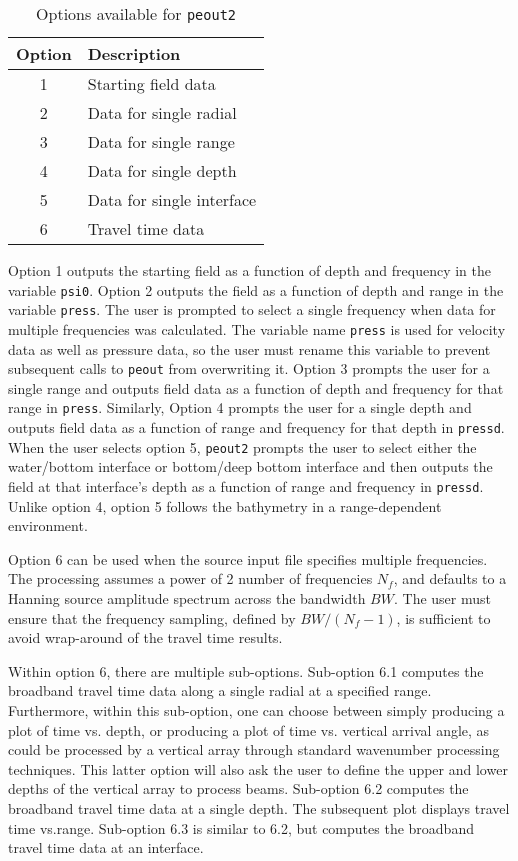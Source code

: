 \begin{table}[!ht]
	\begin{center}
		\caption{Options available for \texttt{peout2}}
		\label{tab:peout2options}
		\begin{tabular}{c|l} 
			\textbf{Option} & \textbf{Description}\\
			\hline
			1 & Starting field data \\
			2 & Data for single radial \\
			3 & Data for single range \\
			4 & Data for single depth \\
			5 & Data for single interface \\
			6 & Travel time data \\
		\end{tabular}
	\end{center}
\end{table}

Option 1 outputs the starting field as a function of depth and frequency in the variable \texttt{psi0}. Option 2 outputs the field as a function of depth and range in the variable \texttt{press}. The user is prompted to select a single frequency when data for multiple frequencies was calculated. The variable name \texttt{press} is used for velocity data as well as pressure data, so the user must rename this variable to prevent subsequent calls to \texttt{peout} from overwriting it. Option 3 prompts the user for a single range and outputs field data as a function of depth and frequency for that range in \texttt{press}. Similarly, Option 4 prompts the user for a single depth and outputs field data as a function of range and frequency for that depth in \texttt{pressd}. When the user selects option 5, \texttt{peout2} prompts the user to select either the water/bottom interface or bottom/deep bottom interface and then outputs the field at that interface's depth as a function of range and frequency in \texttt{pressd}. Unlike option 4, option 5 follows the bathymetry in a range-dependent environment. 

Option 6 can be used when the source input file specifies multiple frequencies.  The processing assumes a power of 2 number of frequencies
$N_f$, and defaults to a Hanning source amplitude spectrum across the bandwidth $BW$.  The user must ensure that the frequency sampling, defined by $BW/(N_f-1)$, is sufficient to avoid wrap-around of the travel time results.

Within option 6, there are multiple sub-options.  Sub-option 6.1 computes the broadband travel time data along a single radial at a specified range. Furthermore, within this sub-option, one can choose between simply producing a plot of time vs. depth, or producing a plot of time vs. vertical arrival angle, as could be processed by a vertical array through standard wavenumber processing techniques.  This latter option will also ask the user to define the upper and lower depths of the vertical array to process beams. Sub-option 6.2 computes the broadband travel time data at a single depth. The subsequent plot displays travel time vs.range. Sub-option 6.3 is similar to 6.2, but computes the broadband travel time data at an interface.

